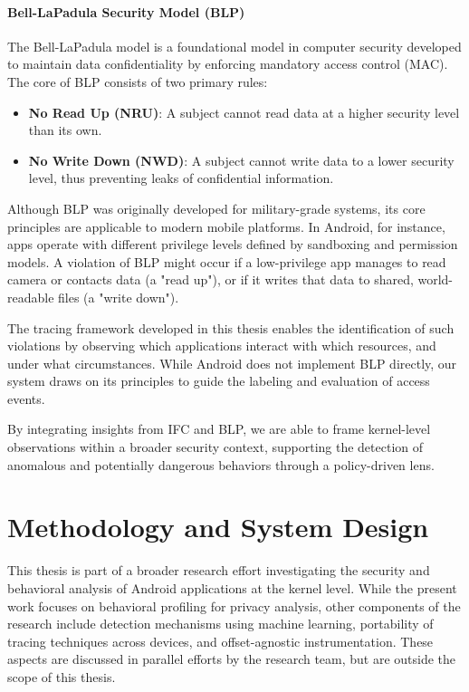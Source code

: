 \documentclass[a4paper,12pt]{report}
\begin{document}
\subsubsection{Bell-LaPadula Security Model (BLP)}

The Bell-LaPadula model is a foundational model in computer security developed to maintain data confidentiality by enforcing mandatory access control (MAC). The core of BLP consists of two primary rules:

\begin{itemize}
    \item \textbf{No Read Up (NRU)}: A subject cannot read data at a higher security level than its own.
    \item \textbf{No Write Down (NWD)}: A subject cannot write data to a lower security level, thus preventing leaks of confidential information.
\end{itemize}

Although BLP was originally developed for military-grade systems, its core principles are applicable to modern mobile platforms. In Android, for instance, apps operate with different privilege levels defined by sandboxing and permission models. A violation of BLP might occur if a low-privilege app manages to read camera or contacts data (a "read up"), or if it writes that data to shared, world-readable files (a "write down").

The tracing framework developed in this thesis enables the identification of such violations by observing which applications interact with which resources, and under what circumstances. While Android does not implement BLP directly, our system draws on its principles to guide the labeling and evaluation of access events.

\bigskip

By integrating insights from IFC and BLP, we are able to frame kernel-level observations within a broader security context, supporting the detection of anomalous and potentially dangerous behaviors through a policy-driven lens.



\chapter{Methodology and System Design}

This thesis is part of a broader research effort investigating the security and behavioral analysis of Android applications at the kernel level. While the present work focuses on behavioral profiling for privacy analysis, other components of the research include detection mechanisms using machine learning, portability of tracing techniques across devices, and offset-agnostic instrumentation. These aspects are discussed in parallel efforts by the research team, but are outside the scope of this thesis.
\end{document}
